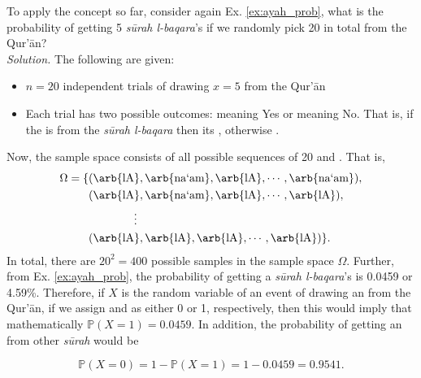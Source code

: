 \begin{exmpx}\label{ex:binom_manual}
To apply the concept so far, consider again Ex. \ref{ex:ayah_prob}, what is the probability of getting 5 \textit{s\=urah l-baqara}'s   if we randomly pick 20   in total from the Qur'\=an?\\
\textit{Solution.} The following are given:
\begin{itemize}
    \item $n=20$ independent trials of drawing $x=5$  from the Qur'\=an
    \item Each trial has two possible outcomes:   meaning Yes or   meaning No. That is, if the    is from the \textit{s\=urah l-baqara}  then its , otherwise .
\end{itemize}
Now, the sample space consists of all possible sequences of 20  and . That is,
\begin{align}
    \Omega=\{&
        (\text{\arb{lA}},\text{\arb{na`am}},\text{\arb{lA}},\cdots,\text{\arb{na`am}}),\\
        &(\text{\arb{lA}},\text{\arb{na`am}},\text{\arb{lA}},\cdots,\text{\arb{lA}}),\\
        &\qquad\qquad\vdots\\
        &(\text{\arb{lA}},\text{\arb{lA}},\text{\arb{lA}},\cdots,\text{\arb{lA}})\}.
\end{align}
In total, there are $20^2=400$ possible samples in the sample space $\Omega$. Further, from Ex. \ref{ex:ayah_prob}, the probability of getting a \textit{s\=urah l-baqara}'s   is 0.0459 or 4.59\%. Therefore, if $X$ is the random variable of an event of drawing an  from the Qur'\=an, if we assign   and  as either 0 or 1, respectively, then this would imply that mathematically $\mathbb{P}(X=1)=0.0459$. In addition, the probability of getting an   from other \textit{s\=urah}  would be

\begin{equation}    
\mathbb{P}(X=0)=1-\mathbb{P}(X=1)=1-0.0459=0.9541.
\end{equation}


\end{exmpx}

